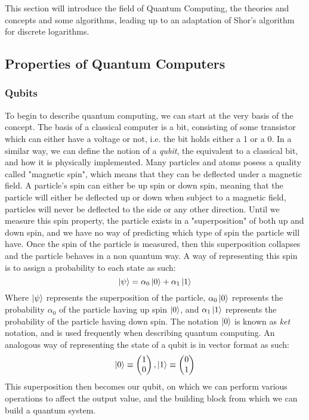 This section will introduce the field of Quantum Computing, the theories and concepts and some algorithms, leading up to an adaptation of Shor's algorithm for discrete logarithms.
\subsection{Properties of Quantum Computers}
\subsubsection{Qubits}
To begin to describe quantum computing, we can start at the very basis of the concept. The basis of a classical computer is a bit, consisting of some transistor which can either have a voltage or not, i.e. the bit holds either a 1 or a 0. In a similar way, we can define the notion of a \emph{qubit}, the equivalent to a classical bit, and how it is physically implemented. Many particles and atoms posess a quality called "magnetic spin", which means that they can be deflected under a magnetic field. A particle's spin can either be up spin or down spin, meaning that the particle will either be deflected up or down when subject to a magnetic field, particles will never be deflected to the side or any other direction. Until we measure this spin property, the particle exists in a "superposition" of both up and down spin, and we have no way of predicting which type of spin the particle will have. Once the spin of the particle is measured, then this superposition collapses and the particle behaves in a non quantum way. A way of representing this spin is to assign a probability to each state as such: $$\ket{\psi} = \alpha_0\ket{0} + \alpha_1\ket{1}$$ Where $\ket{\psi}$ represents the superposition of the particle, $\alpha_0\ket{0}$ represents the probability $\alpha_0$ of the particle having up spin $\ket{0}$, and $\alpha_1\ket{1}$ represents the probability of the particle having down spin. The notation $\ket{0}$ is known as \emph{ket} notation, and is used frequently when describing quantum computing. An analogous way of representing the state of a qubit is in vector format as such: 
$$\ket{0} \equiv \begin{pmatrix}1 \\ 0 \end{pmatrix}, \ket{1} \equiv \begin{pmatrix}0 \\ 1 \end{pmatrix}$$ This superposition then becomes our qubit, on which we can perform various operations to affect the output value, and the building block from which we can build a quantum system.
